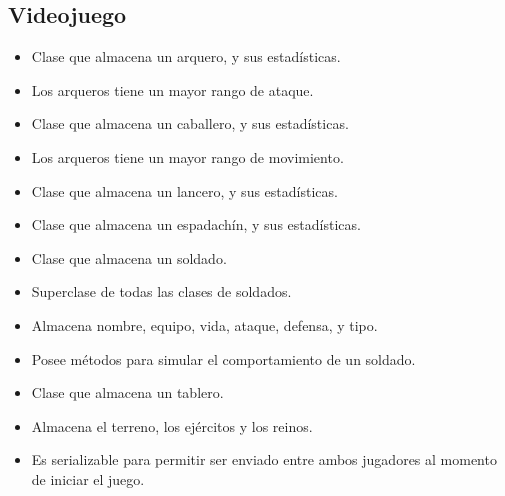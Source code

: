 \documentclass{article}
\begin{document}
\subsection{Videojuego}

\begin{itemize}
	\item Clase que almacena un arquero, y sus estadísticas.
	\item Los arqueros tiene un mayor rango de ataque.
\end{itemize}

\begin{itemize}
	\item Clase que almacena un caballero, y sus estadísticas.
	\item Los arqueros tiene un mayor rango de movimiento.
\end{itemize}

\begin{itemize}
	\item Clase que almacena un lancero, y sus estadísticas.
\end{itemize}

\begin{itemize}
	\item Clase que almacena un espadachín, y sus estadísticas.
\end{itemize}

\begin{itemize}
	\item Clase que almacena un soldado.
	\item Superclase de todas las clases de soldados.
	\item Almacena nombre, equipo, vida, ataque, defensa, y tipo.
	\item Posee métodos para simular el comportamiento de un soldado.
\end{itemize}

\begin{itemize}
	\item Clase que almacena un tablero.
	\item Almacena el terreno, los ejércitos y los reinos.
	\item Es serializable para permitir ser enviado entre ambos jugadores al momento de iniciar el juego.
\end{itemize}
\end{document}
